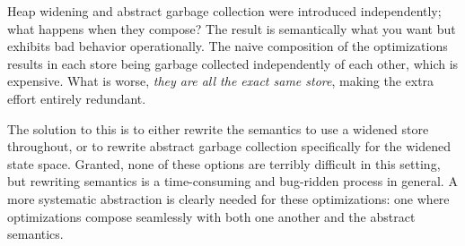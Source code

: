 Heap widening and abstract garbage collection were introduced independently;
what happens when they compose?
%
The result is semantically what you want but exhibits bad behavior
operationally.
%
The naive composition of the optimizations results in each store being garbage
collected independently of each other, which is expensive.
%
What is worse, \textit{they are all the exact same store}, making the extra
effort entirely redundant.


The solution to this is to either rewrite the semantics to use a widened store
throughout, or to rewrite abstract garbage collection specifically for the
widened state space.
%
Granted, none of these options are terribly difficult in this setting, but
rewriting semantics is a time-consuming and bug-ridden process in general.
%
A more systematic abstraction is clearly needed for these optimizations: one
where optimizations compose seamlessly with both one another and the abstract
semantics.
